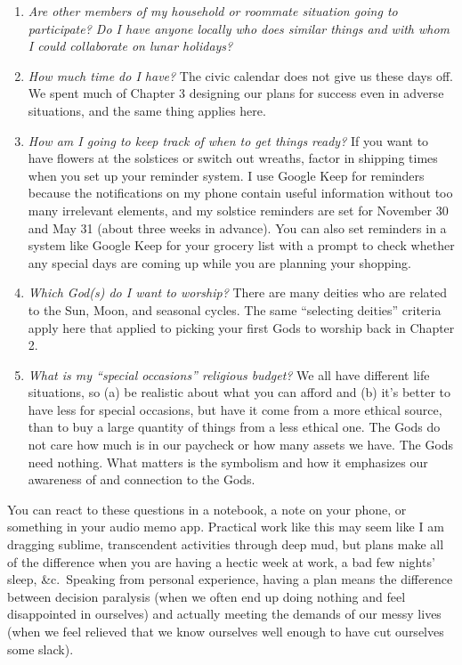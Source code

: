 \documentclass[
]{book}
\providecommand{\tightlist}{%
  \setlength{\itemsep}{0pt}\setlength{\parskip}{0pt}}
\begin{document}
\begin{enumerate}
\def\labelenumi{\arabic{enumi}.}
\tightlist
\item
  \emph{Are other members of my household or roommate situation going to participate? Do I have anyone locally who does similar things and with whom I could collaborate on lunar holidays?}
\item
  \emph{How much time do I have?} The civic calendar does not give us these days off. We spent much of Chapter 3 designing our plans for success even in adverse situations, and the same thing applies here.
\item
  \emph{How am I going to keep track of when to get things ready?} If you want to have flowers at the solstices or switch out wreaths, factor in shipping times when you set up your reminder system. I use Google Keep for reminders because the notifications on my phone contain useful information without too many irrelevant elements, and my solstice reminders are set for November 30 and May 31 (about three weeks in advance). You can also set reminders in a system like Google Keep for your grocery list with a prompt to check whether any special days are coming up while you are planning your shopping.
\item
  \emph{Which God(s) do I want to worship?} There are many deities who are related to the Sun, Moon, and seasonal cycles. The same ``selecting deities'' criteria apply here that applied to picking your first Gods to worship back in Chapter 2.
\item
  \emph{What is my ``special occasions'' religious budget?} We all have different life situations, so (a) be realistic about what you can afford and (b) it's better to have less for special occasions, but have it come from a more ethical source, than to buy a large quantity of things from a less ethical one. The Gods do not care how much is in our paycheck or how many assets we have. The Gods need nothing. What matters is the symbolism and how it emphasizes our awareness of and connection to the Gods.
\end{enumerate}

You can react to these questions in a notebook, a note on your phone, or something in your audio memo app. Practical work like this may seem like I am dragging sublime, transcendent activities through deep mud, but plans make all of the difference when you are having a hectic week at work, a bad few nights' sleep, \&c.~Speaking from personal experience, having a plan means the difference between decision paralysis (when we often end up doing nothing and feel disappointed in ourselves) and actually meeting the demands of our messy lives (when we feel relieved that we know ourselves well enough to have cut ourselves some slack).
\end{document}
